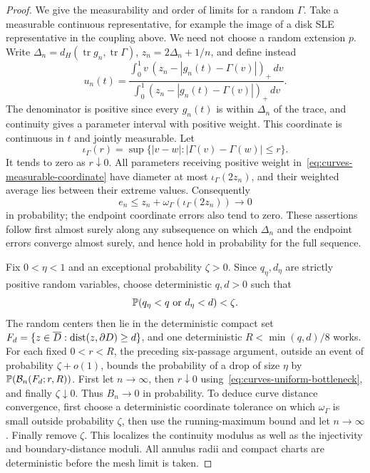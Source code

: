\begin{proof}
We give the measurability and order of limits for a random $\Gamma$.
Take a measurable continuous representative, for example the image of
a disk SLE representative in the coupling above.  We need not choose
a random extension $p$.  Write
$\Delta_n=d_H(\operatorname{tr}g_n,\operatorname{tr}\Gamma)$,
$z_n=2\Delta_n+1/n$, and define instead
\begin{equation}
 u_n(t)=
 \frac{\int_0^1 v\,(z_n-|g_n(t)-\Gamma(v)|)_+\,dv}
      {\int_0^1 (z_n-|g_n(t)-\Gamma(v)|)_+\,dv}.
 \label{eq:curves-measurable-coordinate}
\end{equation}
The denominator is positive since every $g_n(t)$ is within $\Delta_n$
of the trace, and continuity gives a parameter interval with positive
weight.  This coordinate is continuous in $t$ and jointly measurable.
Let
\[
 \iota_\Gamma(r)=\sup\{|v-w|:|\Gamma(v)-\Gamma(w)|\leq r\}.
\]
It tends to zero as $r\downarrow0$.  All parameters receiving positive
weight in~\eqref{eq:curves-measurable-coordinate} have diameter at most
$\iota_\Gamma(2z_n)$, and their weighted average lies between their
extreme values.  Consequently
\[
 e_n\leq z_n+
 \omega_\Gamma(\iota_\Gamma(2z_n))\longrightarrow0
\]
in probability; the endpoint coordinate errors also tend to zero.
These assertions follow first almost surely along any subsequence on
which $\Delta_n$ and the endpoint errors converge almost surely, and
hence hold in probability for the full sequence.

Fix $0<\eta<1$ and an exceptional probability $\zeta>0$.  Since
$q_\eta,d_\eta$ are strictly positive random variables, choose
deterministic $q,d>0$ such that
\[
 \P(q_\eta<q\ \text{or}\ d_\eta<d)<\zeta.
\]
The random centers then lie in the deterministic compact set
$F_d=\{z\in\overline D:\dist(z,\partial D)\geq d\}$, and one
deterministic $R<\min(q,d)/8$ works.  For each fixed $0<r<R$,
the preceding six-passage argument, outside an event of probability
$\zeta+o(1)$, bounds the probability of a drop of size $\eta$ by
$\P(\mathcal B_n(F_d;r,R))$.  First let $n\to\infty$, then
$r\downarrow0$ using~\eqref{eq:curves-uniform-bottleneck}, and finally
$\zeta\downarrow0$.  Thus $B_n\to0$ in probability.  To deduce curve
distance convergence, first choose a deterministic coordinate tolerance
on which $\omega_\Gamma$ is small outside probability $\zeta$, then use
the running-maximum bound and let $n\to\infty$.  Finally remove
$\zeta$.  This localizes the continuity modulus as well as the
injectivity and boundary-distance moduli.  All annulus radii and compact
charts are deterministic before the mesh limit is taken.
\end{proof}

